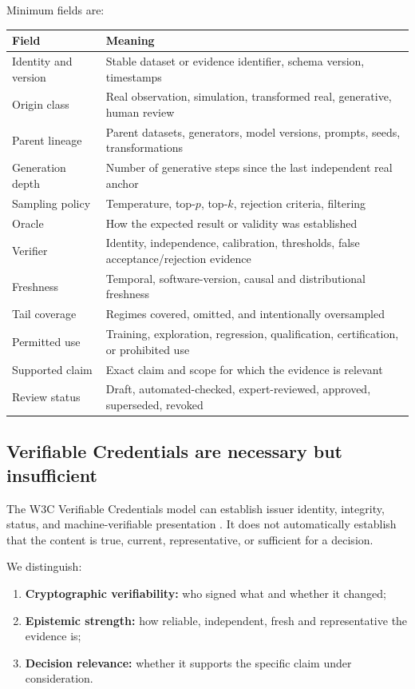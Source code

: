 Minimum fields are:

\begin{longtable}{p{}p{}}
\toprule
\textbf{Field} & \textbf{Meaning} \\
\midrule
Identity and version & Stable dataset or evidence identifier, schema version, timestamps \\
Origin class & Real observation, simulation, transformed real, generative, human review \\
Parent lineage & Parent datasets, generators, model versions, prompts, seeds, transformations \\
Generation depth & Number of generative steps since the last independent real anchor \\
Sampling policy & Temperature, top-$p$, top-$k$, rejection criteria, filtering \\
Oracle & How the expected result or validity was established \\
Verifier & Identity, independence, calibration, thresholds, false acceptance/rejection evidence \\
Freshness & Temporal, software-version, causal and distributional freshness \\
Tail coverage & Regimes covered, omitted, and intentionally oversampled \\
Permitted use & Training, exploration, regression, qualification, certification, or prohibited use \\
Supported claim & Exact claim and scope for which the evidence is relevant \\
Review status & Draft, automated-checked, expert-reviewed, approved, superseded, revoked \\
\bottomrule
\end{longtable}

\subsection{Verifiable Credentials are necessary but insufficient}

The W3C Verifiable Credentials model can establish issuer identity, integrity, status, and machine-verifiable presentation \citep{w3cvc2025}. It does not automatically establish that the content is true, current, representative, or sufficient for a decision.

We distinguish:

\begin{enumerate}[leftmargin=*]
  \item \textbf{Cryptographic verifiability:} who signed what and whether it changed;
  \item \textbf{Epistemic strength:} how reliable, independent, fresh and representative the evidence is;
  \item \textbf{Decision relevance:} whether it supports the specific claim under consideration.
\end{enumerate}

